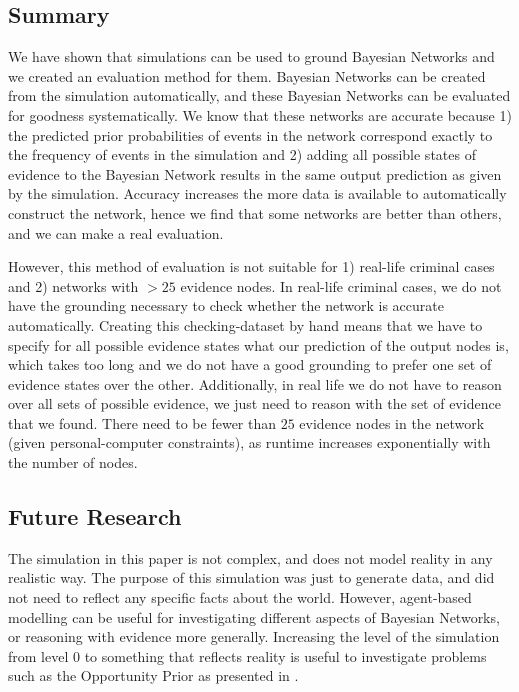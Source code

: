 \documentclass[12pt]{article}
\begin{document}
\subsection{Summary}
We have shown that simulations can be used to ground Bayesian Networks and we created an evaluation method for them. Bayesian Networks can be created from the simulation automatically, and these Bayesian Networks can be evaluated for goodness systematically. We know that these networks are accurate because 1) the predicted prior probabilities of events in the network correspond exactly to the frequency of events in the simulation and 2) adding all possible states of evidence to the Bayesian Network results in the same output prediction as given by the simulation. Accuracy increases the more data is available to automatically construct the network, hence we find that some networks are better than others, and we can make a real evaluation.

 However, this method of evaluation is not suitable for 1) real-life criminal cases and 2) networks with $> 25$ evidence nodes. In real-life criminal cases, we do not have the grounding necessary to check whether the network is accurate automatically. Creating this checking-dataset by hand means that we have to specify for all possible evidence states what our prediction of the output nodes is, which takes too long and we do not have a good grounding to prefer one set of evidence states over the other. Additionally, in real life we do not have to reason over all sets of possible evidence, we just need to reason with the set of evidence that we found. There need to be fewer than $25$ evidence nodes in the network (given personal-computer constraints), as runtime increases exponentially with the number of nodes.

 
\subsection{Future Research}

The simulation in this paper is not complex, and does not model reality in any realistic way. The purpose of this simulation was just to generate data, and did not need to reflect any specific facts about the world. However, agent-based modelling can be useful for investigating different aspects of Bayesian Networks, or reasoning with evidence more generally. Increasing the level of the simulation from level 0 to something that reflects reality is useful to investigate problems such as the Opportunity Prior as presented in \citet{Fenton2017}. 
\end{document}
